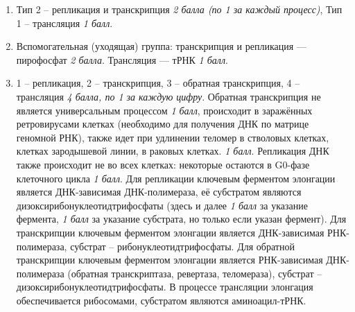 \solutionSection

\begin{enumerate}
    \item Тип 2 – репликация и транскрипция \textit{2 балла (по 1 за каждый процесс)}, Тип 1 – трансляция \textit{1 балл}.
    \item Вспомогательная (уходящая) группа: транскрипция и репликация — пирофосфат \textit{2 балла}. Трансляция — тРНК \textit{1 балл}.
    \item 1 – репликация, 2 – транскрипция, 3 – обратная транскрипция, 4 – трансляция \textit{4 балла, по 1 за каждую цифру}. 
    Обратная транскрипция не является универсальным процессом \textit{1 балл}, происходит в заражённых ретровирусами 
    клетках (необходимо для получения ДНК по матрице геномной РНК), также  идет при удлинении теломер в 
    стволовых клетках, клетках зародышевой линии, в раковых клетках. \textit{1 балл}. Репликация ДНК также происходит 
    не во всех клетках: некоторые остаются в G0-фазе клеточного цикла \textit{1 балл}. Для репликации ключевым ферментом 
    элонгации является ДНК-зависимая ДНК-полимераза, её субстратом являются дизоксирибонуклеотидтрифосфаты (здесь 
    и далее \textit{1 балл} за указание фермента, \textit{1 балл} за указание субстрата, но только если указан фермент). 
    Для транскрипции ключевым ферментом элонгации является ДНК-зависимая РНК-полимераза, субстрат – 
    рибонуклеотидтрифосфаты. Для обратной транскрипции ключевым ферментом элонгации является РНК-зависимая 
    ДНК-полимераза (обратная транскриптаза, ревертаза, теломераза), субстрат – дизоксирибонуклеотидтрифосфаты. 
    В процессе трансляции элонгация обеспечивается рибосомами, субстратом являются аминоацил-тРНК.
\end{enumerate}